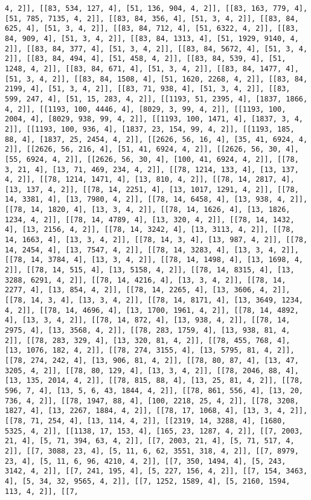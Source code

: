 \documentclass[12pt,fleqn]{article}\usepackage{../../common}
\begin{document}
\begin{verbatim}
4, 2]], [[83, 534, 127, 4], [51, 136, 904, 4, 2]], [[83, 163, 779, 4], [51, 785, 7135, 4, 2]], [[83, 84, 356, 4], [51, 3, 4, 2]], [[83, 84, 625, 4], [51, 3, 4, 2]], [[83, 84, 712, 4], [51, 6322, 4, 2]], [[83, 84, 909, 4], [51, 3, 4, 2]], [[83, 84, 1313, 4], [51, 1929, 9140, 4, 2]], [[83, 84, 377, 4], [51, 3, 4, 2]], [[83, 84, 5672, 4], [51, 3, 4, 2]], [[83, 84, 494, 4], [51, 458, 4, 2]], [[83, 84, 539, 4], [51, 1248, 4, 2]], [[83, 84, 671, 4], [51, 3, 4, 2]], [[83, 84, 1477, 4], [51, 3, 4, 2]], [[83, 84, 1508, 4], [51, 1620, 2268, 4, 2]], [[83, 84, 2199, 4], [51, 3, 4, 2]], [[83, 71, 938, 4], [51, 3, 4, 2]], [[83, 599, 247, 4], [51, 15, 283, 4, 2]], [[1193, 51, 2395, 4], [1837, 1866, 4, 2]], [[1193, 100, 4446, 4], [8029, 3, 99, 4, 2]], [[1193, 100, 2004, 4], [8029, 938, 99, 4, 2]], [[1193, 100, 1471, 4], [1837, 3, 4, 2]], [[1193, 100, 936, 4], [1837, 23, 154, 99, 4, 2]], [[1193, 185, 88, 4], [1837, 25, 2454, 4, 2]], [[2626, 56, 16, 4], [35, 41, 6924, 4, 2]], [[2626, 56, 216, 4], [51, 41, 6924, 4, 2]], [[2626, 56, 30, 4], [55, 6924, 4, 2]], [[2626, 56, 30, 4], [100, 41, 6924, 4, 2]], [[78, 3, 21, 4], [13, 71, 469, 234, 4, 2]], [[78, 1214, 133, 4], [13, 137, 4, 2]], [[78, 1214, 1471, 4], [13, 810, 4, 2]], [[78, 14, 2817, 4], [13, 137, 4, 2]], [[78, 14, 2251, 4], [13, 1017, 1291, 4, 2]], [[78, 14, 3381, 4], [13, 7980, 4, 2]], [[78, 14, 6458, 4], [13, 938, 4, 2]], [[78, 14, 1820, 4], [13, 3, 4, 2]], [[78, 14, 1626, 4], [13, 1826, 1234, 4, 2]], [[78, 14, 4789, 4], [13, 320, 4, 2]], [[78, 14, 1432, 4], [13, 2156, 4, 2]], [[78, 14, 3242, 4], [13, 3113, 4, 2]], [[78, 14, 1663, 4], [13, 3, 4, 2]], [[78, 14, 3, 4], [13, 987, 4, 2]], [[78, 14, 2454, 4], [13, 7547, 4, 2]], [[78, 14, 3283, 4], [13, 3, 4, 2]], [[78, 14, 3784, 4], [13, 3, 4, 2]], [[78, 14, 1498, 4], [13, 1698, 4, 2]], [[78, 14, 515, 4], [13, 5158, 4, 2]], [[78, 14, 8315, 4], [13, 3288, 6291, 4, 2]], [[78, 14, 4216, 4], [13, 3, 4, 2]], [[78, 14, 2277, 4], [13, 854, 4, 2]], [[78, 14, 2265, 4], [13, 3606, 4, 2]], [[78, 14, 3, 4], [13, 3, 4, 2]], [[78, 14, 8171, 4], [13, 3649, 1234, 4, 2]], [[78, 14, 4696, 4], [13, 1700, 1961, 4, 2]], [[78, 14, 4892, 4], [13, 3, 4, 2]], [[78, 14, 872, 4], [13, 938, 4, 2]], [[78, 14, 2975, 4], [13, 3568, 4, 2]], [[78, 283, 1759, 4], [13, 938, 81, 4, 2]], [[78, 283, 329, 4], [13, 320, 81, 4, 2]], [[78, 455, 768, 4], [13, 1076, 182, 4, 2]], [[78, 274, 3155, 4], [13, 5795, 81, 4, 2]], [[78, 274, 242, 4], [13, 906, 81, 4, 2]], [[78, 80, 87, 4], [13, 47, 3205, 4, 2]], [[78, 80, 129, 4], [13, 3, 4, 2]], [[78, 2046, 88, 4], [13, 135, 2014, 4, 2]], [[78, 815, 88, 4], [13, 25, 81, 4, 2]], [[78, 596, 7, 4], [13, 5, 6, 43, 1844, 4, 2]], [[78, 861, 556, 4], [13, 20, 736, 4, 2]], [[78, 1947, 88, 4], [100, 2218, 25, 4, 2]], [[78, 3208, 1827, 4], [13, 2267, 1884, 4, 2]], [[78, 17, 1068, 4], [13, 3, 4, 2]], [[78, 71, 254, 4], [13, 114, 4, 2]], [[2319, 14, 3288, 4], [1680, 5325, 4, 2]], [[1138, 17, 153, 4], [165, 23, 1287, 4, 2]], [[7, 2003, 21, 4], [5, 71, 394, 63, 4, 2]], [[7, 2003, 21, 4], [5, 71, 517, 4, 2]], [[7, 3088, 23, 4], [5, 11, 6, 62, 3551, 318, 4, 2]], [[7, 8979, 23, 4], [5, 11, 6, 96, 4210, 4, 2]], [[7, 350, 1494, 4], [5, 243, 3142, 4, 2]], [[7, 241, 195, 4], [5, 227, 156, 4, 2]], [[7, 154, 3463, 4], [5, 34, 32, 9565, 4, 2]], [[7, 1252, 1589, 4], [5, 2160, 1594, 113, 4, 2]], [[7, 
\end{verbatim}
\end{document}
